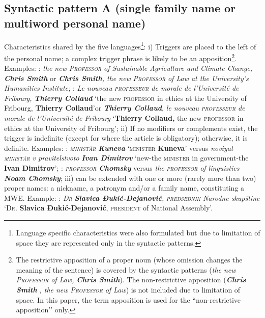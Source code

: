 \documentclass[output=paper]{langsci/langscibook}
\newcommand{\trigger}[1]{\textsc{#1}}
\begin{document}
\subsection{Syntactic pattern A (single family name or multiword personal name)}
Characteristics shared by the five
languages\footnote{
Language  specific characteristics
were also formulated but due to limitation of space they are
represented only in the syntactic patterns.}: i) Triggers are placed
to the left of the personal name; a complex trigger phrase is likely to
be an
apposition\footnote{The restrictive
apposition of a proper noun (whose omission changes the meaning of the
sentence) is covered by the syntactic patterns
(\textit{the new} \textit{\trigger{Professor}} 
\textit{of Law,} \textbf{\textit{Chris Smith}}). The non-restrictive
apposition (\textbf{\textit{Chris Smith}} \textit{, the new}
\textit{\trigger{Professor}} 
 \textit{of Law}) is not included due to
limitation of space. In this paper, the term apposition is used for the
``non-restrictive apposition’' only.}. Examples: : \textit{the new
}\textit{\trigger{Professor}} \textit{of Sustainable Agriculture and
Climate Change,} \textbf{\textit{Chris Smith}} or \textbf{\textit{Chris
Smith}}\textit{, the new }\textit{\trigger{Professor}} \textit{of Law at
the University's Humanities Institute;} : \textit{Le nouveau}\trigger{
}\textit{\trigger{professeur}} \textit{de morale de l’Université de
Fribourg,} \textbf{\textit{Thierry Collaud}} ‘the new \trigger{professor}
in ethics at the University of Fribourg, \textbf{Thierry Collaud}’or
\textbf{\textit{Thierry Collaud}}, \textit{le nouveau}\trigger{
}\textit{\trigger{professeur}} \textit{de morale de l’Université de
Fribourg }‘\textbf{Thierry Collaud,} the new \trigger{professor} in
ethics at the University of Fribourg’; ii) If no modifiers or
complements exist, the trigger is indefinite (except for  where
the article is obligatory); otherwise, it is definite. Examples: :
\textit{\trigger{ministăr}} \textbf{\textit{Kuneva }}‘\trigger{minister}
\textbf{Kuneva}’\textit{ }versus\textit{ noviyat}
\textit{\trigger{ministăr}} \textit{v pravitelstvoto}
\textbf{\textit{Ivan Dimitrov}} ‘new-the \trigger{minister} in
government-the \textbf{Ivan Dimitrov}’; : \textit{\trigger{professor}}
\textbf{\textit{Chomsky}} versus \textit{the
}\textit{\trigger{professor}} \textit{of linguistics
}\textbf{\textit{Noam Chomsky}}; iii)  can be extended
with one or more (rarely more than two) proper names: a nickname, a
patronym and/or a family name, constituting a MWE. Example: :
\textit{\trigger{Dr}} \textbf{\textit{Slavica Đukić-Dejanović}}\textit{,
}\textit{\trigger{predsednik}} \textit{Narodne skupštine} ‘\trigger{Dr.}
\textbf{Slavica Đukić-Dejanović}, \trigger{president} of National
Assembly’.
\end{document}
